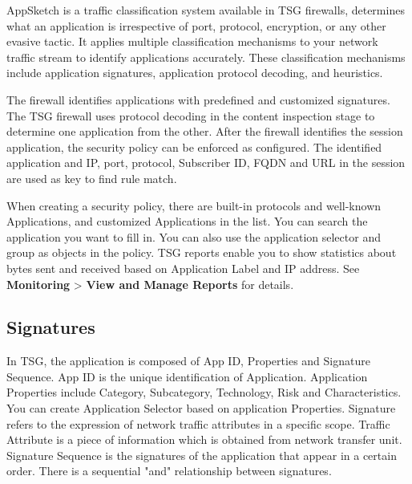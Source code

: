 AppSketch is a traffic classification system available in TSG firewalls, determines what an application is irrespective of port, protocol, encryption, or any other evasive tactic. 
It applies multiple classification mechanisms to your network traffic stream to identify applications accurately. 
These classification mechanisms include application signatures, application protocol decoding, and heuristics.


The firewall identifies applications with predefined and customized signatures. The TSG firewall uses protocol decoding in the content inspection stage to determine one application from the other. 
After the firewall identifies the session application, the security policy can be enforced as configured. 
The identified application and IP, port, protocol, Subscriber ID, FQDN and URL in the session are used as key to find rule match.


When creating a security policy, there are built-in protocols and well-known Applications, and customized Applications in the list. 
You can search the application you want to fill in. You can also use the application selector and group as objects in the policy.
TSG reports enable you to show statistics about bytes sent and received based on Application Label and IP address. See \textbf{Monitoring} > \textbf{View and Manage Reports} for details.

\subsection*{\hypertarget{link:Signatures}{Signatures}}
\label{sec:objects:application:signature}

In TSG, the application is composed of App ID, Properties and Signature Sequence. App ID is the unique identification of Application. 
Application Properties include Category, Subcategory, Technology, Risk and Characteristics. You can create Application Selector based on application Properties. 
Signature refers to the expression of network traffic attributes in a specific scope. Traffic Attribute is a piece of information which is obtained from network transfer unit. 
Signature Sequence is the signatures of the application that appear in a certain order. There is a sequential "and" relationship between signatures.



